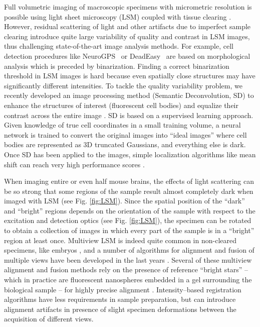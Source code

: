\documentclass[smallextended]{svjour3}       %
\begin{document}
Full volumetric imaging of macroscopic specimens with micrometric resolution is possible using light
sheet microscopy (LSM) coupled with tissue clearing
\cite{dodt_ultramicroscopy:_2007,silvestri_confocal_2012,costantini_versatile_2015}. However, residual
scattering of light and other artifacts due to imperfect sample clearing introduce quite large variability
of quality and contrast in LSM images, thus challenging state-of-the-art image analysis methods.
For example, cell detection procedures like
NeuroGPS~\cite{quan_neurogps:_2013} or
DeadEasy~\cite{forero_deadeasy_2009} are based on morphological
analysis which is preceded by binarization. Finding a correct
binarization threshold in LSM images is hard because even spatially
close structures may have significantly different intensities.
To tackle the quality variability
problem, we recently developed an image processing method (Semantic Deconvolution, SD) to enhance the
structures of interest (fluorescent cell bodies) and equalize their contrast across the entire image
\cite{frasconi_large-scale_2014}. SD is based on a supervised learning approach. Given
knowledge of true cell coordinates in a small training volume, a neural network is trained to convert the original images
into ``ideal images'' where cell bodies are represented as 3D truncated Gaussians, and
everything else is dark. Once SD has been applied to
the images, simple localization algorithms like mean shift can reach very high performance scores \cite{frasconi_large-scale_2014}.

When imaging entire or even half mouse brains, the effects of light scattering can be so strong that some
regions of the sample result almost completely dark when imaged with LSM (see Fig. \ref{fig:LSM}). Since
the spatial position of the ``dark'' and ``bright'' regions depends on the orientation of the sample with
respect to the excitation and detection optics (see Fig. \ref{fig:LSM}), the specimen can be rotated to
obtain a collection of images in which every part of the sample is in a ``bright'' region at least once.
Multiview LSM is indeed quite common in non-cleared specimens, like embryos
\cite{huisken_optical_2004,keller_reconstruction_2008}, and a number of algorithms for alignment and fusion
of multiple views have been developed in the last years
\cite{swoger_multi-view_2007,rubio-guivernau_wavelet-based_2012,preibisch_efficient_2014}. Several of these multiview alignment and
fusion methods rely on the presence of reference ``bright stars'' -- which in practice are fluorescent
nanospheres embedded in a gel surrounding the biological sample -- for highly precise alignment
\cite{rubio-guivernau_wavelet-based_2012,preibisch_efficient_2014}. Intensity--based registration algorithms
\cite{swoger_multi-view_2007} have less requirements in sample preparation, but can introduce alignment artifacts
in presence of slight specimen deformations between the acquisition of different views.
\end{document}
